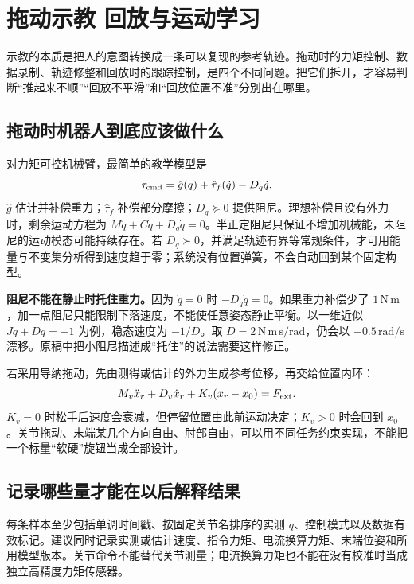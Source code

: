 \chapter{拖动示教 回放与运动学习}
\label{ch:teaching}

示教的本质是把人的意图转换成一条可以复现的参考轨迹。拖动时的力矩控制、数据录制、轨迹修整和回放时的跟踪控制，是四个不同问题。把它们拆开，才容易判断“推起来不顺”“回放不平滑”和“回放位置不准”分别出在哪里。

\section{拖动时机器人到底应该做什么}

对力矩可控机械臂，最简单的教学模型是
\begin{equation}
\tau_{\rm cmd}=\hat g(q)+\hat\tau_f(\dot q)-D_q\dot q.
\end{equation}
$\hat g$ 估计并补偿重力；$\hat\tau_f$ 补偿部分摩擦；$D_q\succeq0$ 提供阻尼。理想补偿且没有外力时，剩余运动方程为 $M\ddot q+C\dot q+D_q\dot q=0$。半正定阻尼只保证不增加机械能，未阻尼的运动模态可能持续存在。若 $D_q\succ0$，并满足轨迹有界等常规条件，才可用能量与不变集分析得到速度趋于零；系统没有位置弹簧，不会自动回到某个固定构型。

\textbf{阻尼不能在静止时托住重力。}因为 $\dot q=0$ 时 $-D_q\dot q=0$。如果重力补偿少了 $1\,\mathrm{N\,m}$，加一点阻尼只能限制下落速度，不能使任意姿态静止平衡。以一维近似 $J\ddot q+D\dot q=-1$ 为例，稳态速度为 $-1/D$。取 $D=2\,\mathrm{N\,m\,s/rad}$，仍会以 $-0.5\,\mathrm{rad/s}$ 漂移。原稿中把小阻尼描述成“托住”的说法需要这样修正。

若采用导纳拖动，先由测得或估计的外力生成参考位移，再交给位置内环：
\begin{equation}
M_v\ddot x_r+D_v\dot x_r+K_v(x_r-x_0)=F_{\rm ext}.
\end{equation}
$K_v=0$ 时松手后速度会衰减，但停留位置由此前运动决定；$K_v>0$ 时会回到 $x_0$。关节拖动、末端某几个方向自由、肘部自由，可以用不同任务约束实现，不能把一个标量“软硬”旋钮当成全部设计。

\section{记录哪些量才能在以后解释结果}

每条样本至少包括单调时间戳、按固定关节名排序的实测 $q$、控制模式以及数据有效标记。建议同时记录实测或估计速度、指令力矩、电流换算力矩、末端位姿和所用模型版本。关节命令不能替代关节测量；电流换算力矩也不能在没有校准时当成独立高精度力矩传感器。

